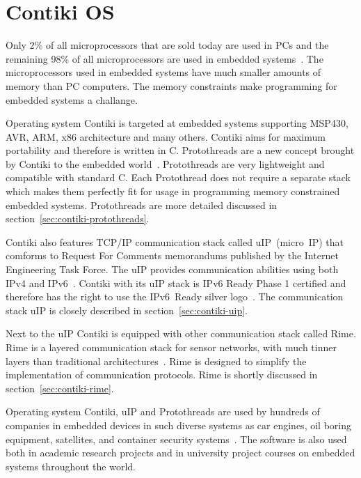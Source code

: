 
\chapter{Contiki OS}
Only 2\% of all microprocessors that are sold today are used in PCs and the remaining 98\%
of all microprocessors are used in embedded systems~\cite{thesis-programming}.
The microprocessors
used in embedded systems have much smaller amounts of memory than PC computers.
The memory constraints make programming for embedded systems a challange.

Operating system Contiki is targeted at embedded systems supporting MSP430, AVR, ARM, x86 architecture and many others.
Contiki aims for maximum portability and therefore is written in C.
Protothreads are a new concept brought by Contiki to the embedded world~\cite{paper-protothreads}.
Protothreads are very lightweight and compatible with standard C.
Each Protothread does not require a separate stack which makes them perfectly
fit for usage in programming memory constrained embedded systems.
Protothreads are more detailed discussed in section~\ref{sec:contiki-protothreads}.

Contiki also features TCP/IP communication stack called uIP~(micro~IP)
that comforms to Request For Comments memorandums published by the Internet Engineering Task Force.
The uIP provides communication abilities using both IPv4 and IPv6~\cite{contiki-docs}.
Contiki with its uIP stack is IPv6 Ready Phase 1 certified
and therefore has the right to use the IPv6~Ready silver logo~\cite{ipv6ready-db}.
The communication stack uIP is closely described in section~\ref{sec:contiki-uip}.

Next to the uIP Contiki is equipped with other communication stack called Rime.
Rime is a layered communication stack for sensor networks,
with much tinner layers than traditional architectures~\cite{paper-rime}.
Rime is designed to simplify the implementation of communication
protocols.
Rime is shortly discussed in section~\ref{sec:contiki-rime}.

Operating system Contiki, uIP and Protothreads are used by hundreds of companies in embedded devices in
such diverse systems as car engines, oil boring equipment, satellites, and container security systems~\cite{thesis-programming}.
The software is also used both in academic research
projects and in university project courses on embedded systems throughout the
world.

